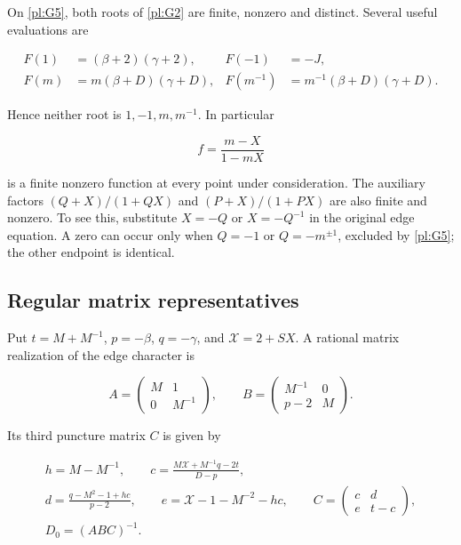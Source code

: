 On \eqref{pl:G5}, both roots of \eqref{pl:G2} are finite, nonzero and distinct.
Several useful evaluations are

\begin{equation}\label{pl:G6}
\begin{aligned}
 F(1)&=(\beta+2)(\gamma+2),&
 F(-1)&=-J,\\
 F(m)&=m(\beta+D)(\gamma+D),&
 F(m^{-1})&=m^{-1}(\beta+D)(\gamma+D).
\end{aligned}
\end{equation}

Hence neither root is \(1,-1,m,m^{-1}\). In particular

\begin{equation}\label{pl:G7}
f=\frac{m-X}{1-mX}
\end{equation}

is a finite nonzero function at every point under consideration.
The auxiliary factors \((Q+X)/(1+QX)\) and
\((P+X)/(1+PX)\) are also finite and nonzero. To see this,
substitute \(X=-Q\) or \(X=-Q^{-1}\) in the original edge
equation. A zero can occur only when \(Q=-1\) or
\(Q=-m^{\pm1}\), excluded by \eqref{pl:G5}; the other endpoint is
identical.

\subsection{Regular matrix representatives}\label{pl:the-actual-character-matrices-remain-regular}

Put \(t=M+M^{-1}\), \(p=-\beta\), \(q=-\gamma\), and
\(\mathcal X=2+SX\). A rational matrix realization of the edge character is

\begin{equation}\label{pl:G8}
A=\begin{pmatrix}M&1\\0&M^{-1}\end{pmatrix},\qquad
 B=\begin{pmatrix}M^{-1}&0\\p-2&M\end{pmatrix}.
\end{equation}

Its third puncture matrix \(C\) is given by

\begin{equation}\label{pl:G9}
\begin{gathered}
 h=M-M^{-1},\qquad
 c=\frac{M\mathcal X+M^{-1}q-2t}{D-p},\\
 d=\frac{q-M^2-1+hc}{p-2},\qquad
 e=\mathcal X-1-M^{-2}-hc,\qquad
 C=\begin{pmatrix}c&d\\e&t-c\end{pmatrix},\\
                         D_0=(ABC)^{-1}.
\end{gathered}
\end{equation}

